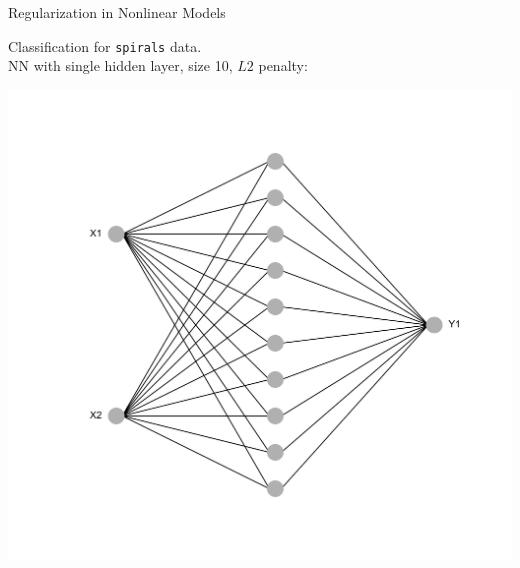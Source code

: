 \documentclass[11pt,compress,t,notes=noshow, xcolor=table]{beamer}
\begin{document}
\begin{frame}{Regularization in Nonlinear Models}

\begin{center}
\begin{minipage}{0.6\textwidth}
{\small
Classification for \texttt{spirals} data.\\
NN with single hidden layer, size 10, $L2$ penalty:}
\end{minipage}%
\begin{minipage}{0.3\textwidth}
\includegraphics[width=1\textwidth]{figure/nn_size_10.png}
\end{minipage}
\end{center}


\vspace{-0.8cm}


\end{frame}
\end{document}

